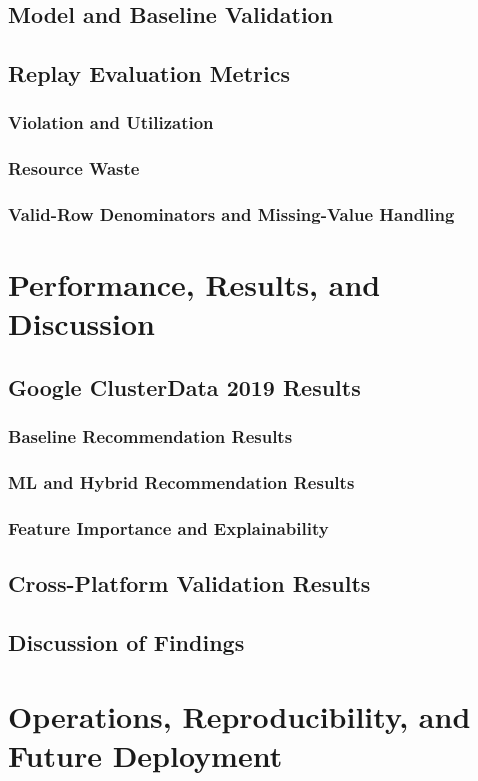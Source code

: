 \documentclass{IEEEtran}
\begin{document}
\subsection{Model and Baseline Validation}
\subsection{Replay Evaluation Metrics}
\subsubsection{Violation and Utilization}
\subsubsection{Resource Waste}
\subsubsection{Valid-Row Denominators and Missing-Value Handling}
\section{Performance, Results, and Discussion}
\subsection{Google ClusterData 2019 Results}
\subsubsection{Baseline Recommendation Results}
\subsubsection{ML and Hybrid Recommendation Results}
\subsubsection{Feature Importance and Explainability}
\subsection{Cross-Platform Validation Results}
\subsection{Discussion of Findings}
\section{Operations, Reproducibility, and Future Deployment}
\end{document}
